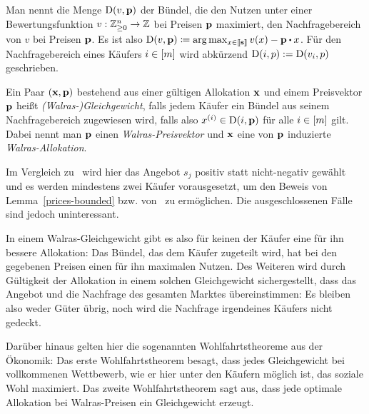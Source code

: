 \begin{definition}[Nachfragebereich]
	Man nennt die Menge $\operatorname{D}(v,\mathbf{p})$ der Bündel, die den Nutzen unter einer Bewertungsfunktion $v:\mathbb{Z}^n_{\geq 0} \rightarrow \mathbb{Z}$ bei Preisen $\mathbf{p}$ maximiert, den Nachfragebereich von $v$ bei Preisen $\mathbf{p}$.
	Es ist also $ \NB(v, \fp) \coloneqq \arg\max_{x\in\ffirst{\fs}} v(x) - \fp \bcdot x$.
	Für den Nachfragebereich eines Käufers $i\in\left[ m \right]$ wird abkürzend $\operatorname{D}(i,p):=\operatorname{D}(v_i, p)$ geschrieben.
\end{definition}

\begin{definition}
	Ein Paar $(\mathbf{x}, \mathbf{p})$ bestehend aus einer gültigen Allokation $\mathbf{x}$ und einem Preisvektor $\mathbf{p}$ heißt \emph{(Walras-)Gleichgewicht}, falls jedem Käufer ein Bündel aus seinem Nachfragebereich zugewiesen wird, falls also $x^{(i)} \in \operatorname{D}(i, \mathbf{p})$ für alle $i\in \left[ m \right]$ gilt.
	Dabei nennt man $\mathbf{p}$ einen \emph{Walras-Preisvektor} und $\mathbf{x}$ eine von $\mathbf{p}$ induzierte \emph{Walras-Allokation}.
\end{definition}

\begin{bemerkung}
	Im Vergleich zu~\cite{PaesLeme2018} wird hier das Angebot $s_j$ positiv statt nicht-negativ gewählt und es werden mindestens zwei Käufer vorausgesetzt, um den Beweis von Lemma~\ref{prices-bounded} bzw. von~\cite[Lemma 4]{PaesLeme2018} zu ermöglichen.
	Die ausgeschlossenen Fälle sind jedoch uninteressant.
\end{bemerkung}

In einem Walras-Gleichgewicht gibt es also für keinen der Käufer eine für ihn bessere Allokation: Das Bündel, das dem Käufer zugeteilt wird, hat bei den gegebenen Preisen einen für ihn maximalen Nutzen.
Des Weiteren wird durch Gültigkeit der Allokation in einem solchen Gleichgewicht sichergestellt, dass das Angebot und die Nachfrage des gesamten Marktes übereinstimmen: Es bleiben also weder Güter übrig, noch wird die Nachfrage irgendeines Käufers nicht gedeckt.

Darüber hinaus gelten hier die sogenannten Wohlfahrtstheoreme aus der Ökonomik:
Das erste Wohlfahrtstheorem besagt, dass jedes Gleichgewicht bei vollkommenen Wettbewerb, wie er hier unter den Käufern möglich ist, das soziale Wohl maximiert.
Das zweite Wohlfahrtstheorem sagt aus, dass jede optimale Allokation bei Walras-Preisen ein Gleichgewicht erzeugt.

